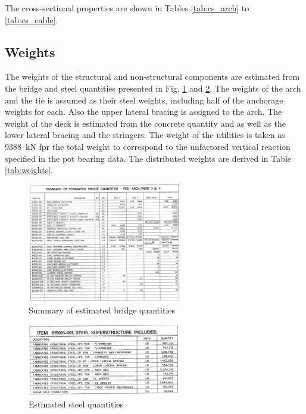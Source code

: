 The cross-sectional properties are shown in Tables \ref{tab:cs_arch} to \ref{tab:cs_cable}.






\subsection{Weights} \label{app:weight}
The weights of the structural and non-structural components are estimated from the bridge and steel quantities presented in Fig. \ref{fig:bridge_quantities} and \ref{fig:steel_quantities}. The weights of the arch and the tie is assumed as their steel weights, including half of the anchorage weights for each. Also the upper lateral bracing is assigned to the arch. The weight of the deck is estimated from the concrete quantity and as well as the lower lateral bracing and the stringers. The weight of the utilities is taken as \SI{9388}{kN} fpr the total weight to correspond to the unfactored vertical reaction specified in the pot bearing data. The distributed weights are derived in Table  \ref{tab:weights}.

\begin{figure}[H]
    \centering
    \includegraphics[trim={0 0 0 0},clip, width=0.6\textwidth]{overleaf/Appendix/Design drawings/estimated bridge quantities.PNG}
    \caption{Summary of estimated bridge quantities}
    \label{fig:bridge_quantities}
\end{figure}
\begin{figure}[H]
    \centering
    \includegraphics[trim={0 0 0 0},clip, width=0.6\textwidth]{overleaf/Appendix/Design drawings/Steel superstructure.PNG}
    \caption{Estimated steel quantities}
    \label{fig:steel_quantities}
\end{figure}

